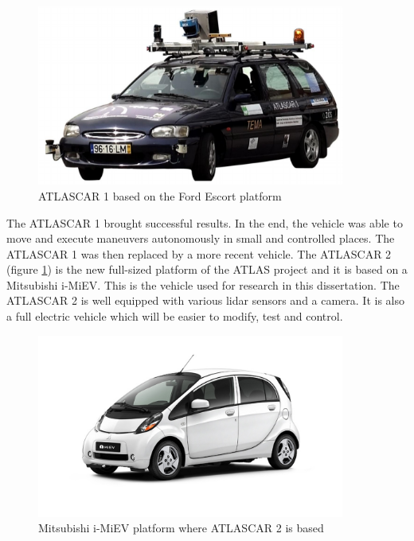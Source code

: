 \begin{figure}[htp]
	
	\centering
	\includegraphics[width=0.9\textwidth]{capintro/imgs/atlascar1}
	
	\caption{ATLASCAR 1 based on the Ford Escort platform}
	\label{fig:atlascar1}
	
\end{figure}

The ATLASCAR 1 brought successful results. In the end, the vehicle was able to move and execute maneuvers autonomously in small and controlled places. The ATLASCAR 1 was then replaced by a more recent vehicle. The ATLASCAR 2 (figure \ref{fig:atlascar1}) is the new full-sized platform of the ATLAS project and it is based on a Mitsubishi i-MiEV. This is the vehicle used for research in this dissertation. The ATLASCAR 2 is well equipped with various \gls{lidar} sensors and a camera. It is also a full electric vehicle which will be easier to modify, test and control. 

\begin{figure}[htp]
	
	\centering
	\includegraphics[width=0.9\textwidth]{capintro/imgs/imiev}
	
	\caption{Mitsubishi i-MiEV platform where ATLASCAR 2 is based}
	\label{fig:atlascar2}
	
\end{figure}


